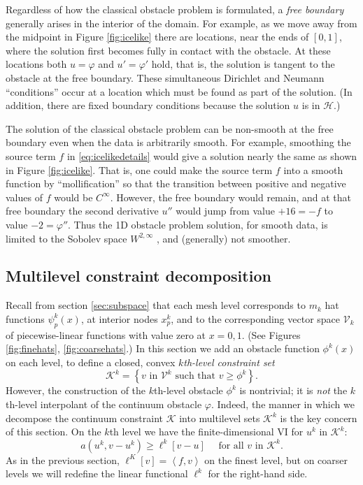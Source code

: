 \documentclass[letterpaper,final,12pt,reqno]{amsart}
\newcommand{\ip}[2]{\left<#1,#2\right>}
\numberwithin{equation}{section}
\numberwithin{figure}{section}
\numberwithin{table}{section}
\begin{document}
Regardless of how the classical obstacle problem is formulated, a \emph{free boundary} generally arises in the interior of the domain.  For example, as we move away from the midpoint in Figure \ref{fig:icelike} there are locations, near the ends of $[0,1]$, where the solution first becomes fully in contact with the obstacle.  At these locations both $u=\varphi$ and $u'=\varphi'$ hold, that is, the solution is tangent to the obstacle at the free boundary.  These simultaneous Dirichlet and Neumann ``conditions'' occur at a location which must be found as part of the solution.  (In addition, there are fixed boundary conditions because the solution $u$ is in $\mathcal{H}$.)

The solution of the classical obstacle problem can be non-smooth at the free boundary even when the data is arbitrarily smooth.  For example, smoothing the source term $f$ in \eqref{eq:icelikedetails} would give a solution nearly the same as shown in Figure \ref{fig:icelike}.  That is, one could make the source term $f$ into a smooth function by ``mollification'' \cite{Evans2010} so that the transition between positive and negative values of $f$ would be $C^\infty$.  However, the free boundary would remain, and at that free boundary the second derivative $u''$ would jump from value $+16=-f$ to value $-2=\varphi''$.  Thus the 1D obstacle problem solution, for smooth data, is limited to the Sobolev space $W^{2,\infty}$ \cite[section IV.6]{KinderlehrerStampacchia1980}, and (generally) not smoother.

\subsection*{Multilevel constraint decomposition}  Recall from section \ref{sec:subspace} that each mesh level corresponds to $m_k$ hat functions $\psi_p^k(x)$, at interior nodes $x_p^k$, and to the corresponding vector space $\mathcal{V}_k$ of piecewise-linear functions with value zero at $x=0,1$.  (See Figures \ref{fig:finehats}, \ref{fig:coarsehats}.)  In this section we add an obstacle function $\phi^k(x)$ on each level, to define a closed, convex $k$\emph{th-level constraint set}
\begin{equation}
\mathcal{K}^k = \left\{v \text{ in } \mathcal{V}^k \text{ such that } v \ge \phi^k\right\}.  \label{eq:levelKdefine}
\end{equation}
However, the construction of the $k$th-level obstacle $\phi^k$ is nontrivial; it is \emph{not} the $k$th-level interpolant of the continuum obstacle $\varphi$.  Indeed, the manner in which we decompose the continuum constraint $\mathcal{K}$ into multilevel sets $\mathcal{K}^k$ is the key concern of this section.  On the $k$th level we have the finite-dimensional VI for $u^k$ in $\mathcal{K}^k$:
\begin{equation}
  a(u^k,v-u^k) \ge \ell^k[v-u] \quad \text{ for all } v \text{ in } \mathcal{K}^k. \label{eq:levelvi}
\end{equation}
As in the previous section, $\ell^K[v]=\ip{f}{v}$ on the finest level, but on coarser levels we will redefine the linear functional $\ell^k$ for the right-hand side.
\end{document}
